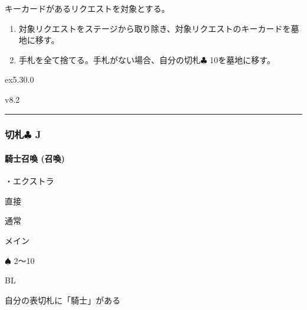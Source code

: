 \documentclass[letterpaper,10pt,dvipdfmx]{sphinxmanual}
\begin{document}
\sphinxAtStartPar
{}

\sphinxAtStartPar
キーカードがあるリクエストを対象とする。

\sphinxAtStartPar
{}
\begin{enumerate}
%
\item {} 
\sphinxAtStartPar
対象リクエストをステージから取り除き、対象リクエストのキーカードを墓地に移す。

\item {} 
\sphinxAtStartPar
手札を全て捨てる。手札がない場合、自分の切札{\normalsize $\clubsuit$} 10を墓地に移す。

\end{enumerate}

\sphinxAtStartPar
{}  ex5.30.0

\sphinxAtStartPar
{}  v8.2


\bigskip\hrule\bigskip



\subsubsection{切札{\normalsize $\clubsuit$} J}
\label{\detokenize{auto/frameActionlist:id80}}

\paragraph{騎士召喚 (召喚)}
\label{\detokenize{auto/frameActionlist:act-summonknight}}\label{\detokenize{auto/frameActionlist:id81}}
\sphinxAtStartPar
{}

\sphinxAtStartPar
・エクストラ

\sphinxAtStartPar
{} 直接

\sphinxAtStartPar
{} 通常

\sphinxAtStartPar
{} メイン

\sphinxAtStartPar
{} {\normalsize $\spadesuit$} 2〜10

\sphinxAtStartPar
{} BL

\sphinxAtStartPar
{}

\sphinxAtStartPar
自分の表切札に「騎士」がある

\sphinxAtStartPar
{}
\end{document}
